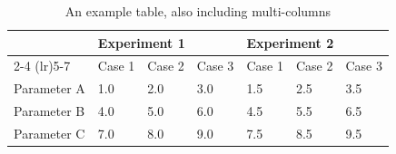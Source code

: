 \begin{table}[bhtp]
    \centering
    \caption{An example table, also including multi-columns}
    \label{tab:example-multicolumn}
    \begin{tabular}{lllllll}
        \toprule
        & \multicolumn{3}{l}{\textbf{Experiment 1}} & \multicolumn{3}{l}{\textbf{Experiment 2}} \\
        \cmidrule(lr){2-4} \cmidrule(lr){5-7}
        & Case 1 & Case 2 & Case 3 & Case 1 & Case 2 & Case 3 \\
        \midrule
        Parameter A & 1.0 & 2.0 & 3.0 & 1.5 & 2.5 & 3.5 \\
        Parameter B & 4.0 & 5.0 & 6.0 & 4.5 & 5.5 & 6.5 \\
        Parameter C & 7.0 & 8.0 & 9.0 & 7.5 & 8.5 & 9.5 \\
        \bottomrule
    \end{tabular}
\end{table}

